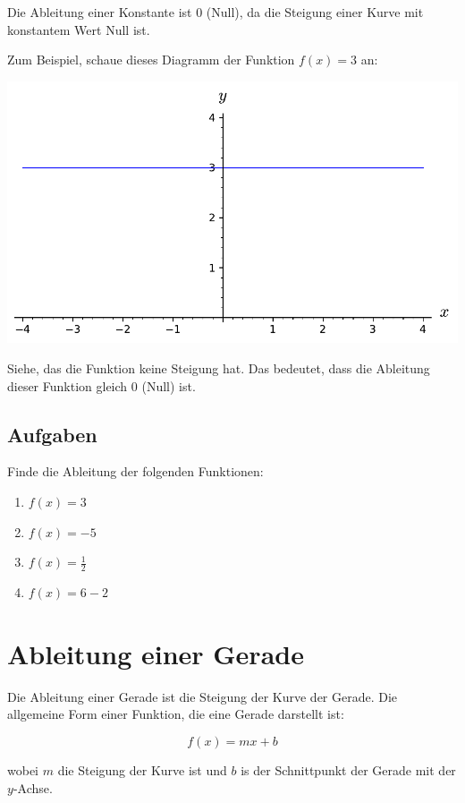 \documentclass{scrartcl}
\begin{document}
Die Ableitung einer Konstante ist 0 (Null), da die Steigung einer Kurve mit
konstantem Wert Null ist.

Zum Beispiel, schaue dieses Diagramm der Funktion $f(x) = 3$ an:

\includegraphics[width=\textwidth]{constant-function.pdf}

Siehe, das die Funktion keine Steigung hat. Das bedeutet, dass die Ableitung
dieser Funktion gleich 0 (Null) ist.

\subsection{Aufgaben}
\label{ex:constants}

Finde die Ableitung der folgenden Funktionen:

\begin{enumerate}
    \item $f(x) = 3$
    \item $f(x) = -5$
    \item $f(x) = \frac{1}{2}$
    \item $f(x) = 6 - 2$
\end{enumerate}

\section{Ableitung einer Gerade}
\label{sec:ableitung-gerade}

Die Ableitung einer Gerade ist die Steigung der Kurve der Gerade.  Die
allgemeine Form einer Funktion, die eine Gerade darstellt ist:

\begin{equation}
    f(x) = m x + b
\end{equation}

wobei $m$ die Steigung der Kurve ist und $b$ is der Schnittpunkt der Gerade
mit der $y$-Achse.
\end{document}
